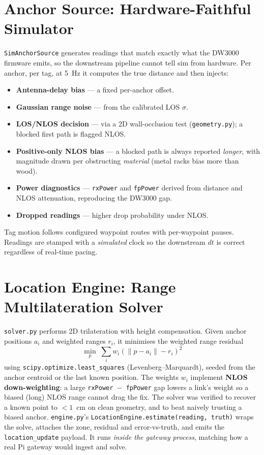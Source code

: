 \documentclass[a4paper,12pt,onecolumn]{report}
\begin{document}
\section{Anchor Source: Hardware-Faithful Simulator}
\texttt{SimAnchorSource} generates readings that match exactly what the DW3000
firmware emits, so the downstream pipeline cannot tell sim from hardware. Per
anchor, per tag, at 5~Hz it computes the true distance and then injects:
\begin{itemize}[nosep]
  \item \textbf{Antenna-delay bias} --- a fixed per-anchor offset.
  \item \textbf{Gaussian range noise} --- from the calibrated LOS $\sigma$.
  \item \textbf{LOS/NLOS decision} --- via a 2D wall-occlusion test
        (\texttt{geometry.py}); a blocked first path is flagged NLOS.
  \item \textbf{Positive-only NLOS bias} --- a blocked path is always reported
        \emph{longer}, with magnitude drawn per obstructing \emph{material}
        (metal racks bias more than wood).
  \item \textbf{Power diagnostics} --- \texttt{rxPower} and \texttt{fpPower}
        derived from distance and NLOS attenuation, reproducing the DW3000 gap.
  \item \textbf{Dropped readings} --- higher drop probability under NLOS.
\end{itemize}
Tag motion follows configured waypoint routes with per-waypoint pauses. Readings
are stamped with a \emph{simulated} clock so the downstream $dt$ is correct
regardless of real-time pacing.

\section{Location Engine: Range Multilateration Solver}
\texttt{solver.py} performs 2D trilateration with height compensation. Given
anchor positions $a_i$ and weighted ranges $r_i$, it minimises the weighted
range residual
\[
\min_{p}\; \sum_i w_i \left( \lVert p - a_i \rVert - r_i \right)^2
\]
using \texttt{scipy.optimize.least\_squares} (Levenberg--Marquardt), seeded from
the anchor centroid or the last known position. The weights $w_i$ implement
\textbf{NLOS down-weighting}: a large \texttt{rxPower $-$ fpPower} gap lowers a
link's weight so a biased (long) NLOS range cannot drag the fix. The solver was
verified to recover a known point to $<1$~cm on clean geometry, and to beat
naively trusting a biased anchor. \texttt{engine.py}'s
\texttt{LocationEngine.estimate(reading, truth)} wraps the solve, attaches the
zone, residual and error-vs-truth, and emits the \texttt{location\_update}
payload. It runs \emph{inside the gateway process}, matching how a real Pi
gateway would ingest and solve.
\end{document}
